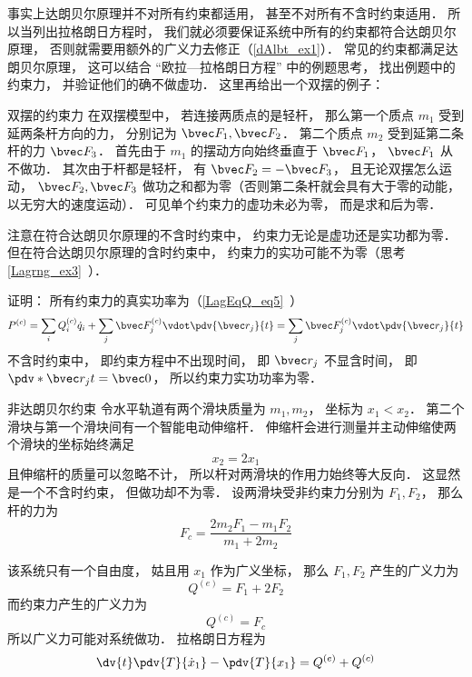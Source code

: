 事实上达朗贝尔原理并不对所有约束都适用， 甚至不对所有不含时约束适用． 所以当列出拉格朗日方程时， 我们就必须要保证系统中所有的约束都符合达朗贝尔原理， 否则就需要用额外的广义力去修正（\autoref{dAlbt_ex1}）． 常见的约束都满足达朗贝尔原理， 这可以结合 “欧拉—拉格朗日方程” 中的例题思考， 找出例题中的约束力， 并验证他们的确不做虚功． 这里再给出一个双摆的例子：

\begin{example}{双摆的约束力}
在双摆模型中， 若连接两质点的是轻杆， 那么第一个质点 $m_1$ 受到延两条杆方向的力， 分别记为 $\bvec F_1, \bvec F_2$． 第二个质点 $m_2$ 受到延第二条杆的力 $\bvec F_3$． 首先由于 $m_1$ 的摆动方向始终垂直于 $\bvec F_1$， $\bvec F_1$ 从不做功． 其次由于杆都是轻杆， 有 $\bvec F_2 = -\bvec F_3$， 且无论双摆怎么运动， $\bvec F_2, \bvec F_3$ 做功之和都为零（否则第二条杆就会具有大于零的动能， 以无穷大的速度运动）． 可见单个约束力的虚功未必为零， 而是求和后为零．
\end{example}

注意在符合达朗贝尔原理的不含时约束中， 约束力无论是虚功还是实功都为零． 但在符合达朗贝尔原理的含时约束中， 约束力的实功可能不为零（思考\autoref{Lagrng_ex3}~）．

证明： 所有约束力的真实功率为（\autoref{LagEqQ_eq5}~）
\begin{equation}
P^{(c)} = \sum_i Q_i^{(c)} \dot q_i + \sum_j \bvec F_j^{(c)} \vdot \pdv{\bvec r_j}{t} = \sum_j \bvec F_j^{(c)} \vdot \pdv{\bvec r_j}{t}
\end{equation}
不含时约束中， 即约束方程中不出现时间， 即 $\bvec r_j$ 不显含时间， 即 $\pdv*{\bvec r_j}{t} = \bvec 0$， 所以约束力实功功率为零．

\begin{example}{非达朗贝尔约束}\label{dAlbt_ex1}
令水平轨道有两个滑块质量为 $m_1,m_2$， 坐标为 $x_1<x_2$． 第二个滑块与第一个滑块间有一个智能电动伸缩杆． 伸缩杆会进行测量并主动伸缩使两个滑块的坐标始终满足
\begin{equation}
x_2 = 2x_1
\end{equation}
且伸缩杆的质量可以忽略不计， 所以杆对两滑块的作用力始终等大反向． 这显然是一个不含时约束， 但做功却不为零． 设两滑块受非约束力分别为 $F_1,F_2$， 那么杆的力为
\begin{equation}
F_c = \frac{2m_2F_1 - m_1F_2}{m_1+2m_2}
\end{equation}

该系统只有一个自由度， 姑且用 $x_1$ 作为广义坐标， 那么 $F_1,F_2$ 产生的广义力为
\begin{equation}
Q^{(e)} = F_1 + 2F_2
\end{equation}
而约束力产生的广义力为
\begin{equation}
Q^{(c)} = F_c
\end{equation}
所以广义力可能对系统做功． 拉格朗日方程为
\begin{equation}
\dv{t}\pdv{T}{\dot x_1} - \pdv{T}{x_1} = Q^{(e)} + Q^{(c)}
\end{equation}
\end{example}

